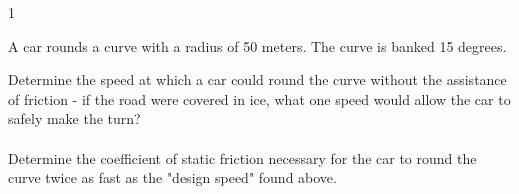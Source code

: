 
\AddToShipoutPicture*{\BackgroundPic}

\addtocounter {ProbNum} {1}

 
{\bf \Large{}} A car rounds a curve with a radius of 50 meters.  The curve is banked 15 degrees.

\bigskip
Determine the speed at which a car could round the curve without the assistance of friction - if the road were covered in ice, what one speed would allow the car to safely make the turn?\paragraph{}
\noindent
\vfill

Determine the coefficient of static friction necessary for the car to round the curve twice as fast as the "design speed" found above.
\vfill

\vfill
\newpage